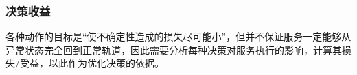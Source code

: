 %
%
%
%        




\subsubsection{决策收益} \label{sec:reward_section}
各种动作的目标是“使不确定性造成的损失尽可能小”，但并不保证服务一定能够从异常状态完全回到正常轨道，因此需要分析每种决策对服务执行的影响，计算其损失/受益，以此作为优化决策的依据。

